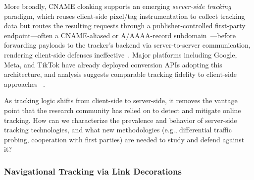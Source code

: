 %
More broadly, CNAME cloaking supports an emerging \emph{server-side tracking} paradigm, which reuses client-side pixel/tag instrumentation to collect tracking data but routes the resulting requests through a publisher-controlled first-party endpoint---often a CNAME-aliased or A/AAAA-record subdomain~\cite{jazlanSSTGuardDetectingCharacterizing2026}---before forwarding payloads to the tracker's backend via server-to-server communication, rendering client-side defenses ineffective~\cite{fouadDevilDetailsDetection2024}.
%
Major platforms including Google, Meta, and TikTok have already deployed conversion APIs adopting this architecture, and analysis suggests comparable tracking fidelity to client-side approaches
~\cite{fraihiClientsideServersideTracking2024}.

\begin{opbox}
As tracking logic shifts from client-side to server-side, it removes the vantage point that the research community has relied on to detect and mitigate online tracking. How can we characterize the prevalence and behavior of server-side tracking technologies, and what new methodologies (e.g., differential traffic probing, cooperation with first parties) are needed to study and defend against it?
\end{opbox}



\subsubsection{Navigational Tracking via Link Decorations}
\label{sec:stateful-techniques-link-decorations}

